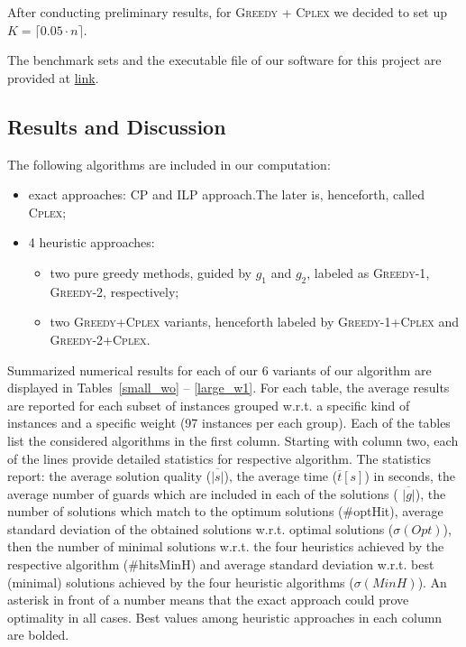\documentclass[runningheads,a4paper]{elsarticle}
\begin{document}
      After conducting preliminary results, for
        \textsc{Greedy + \textsc{Cplex}} we decided to set up $K = \lceil 0.05 \cdot n \rceil$.

     The benchmark sets and the executable file of our software for this project are provided at \href{link}{link}.
	\subsection{Results and Discussion}
        The following algorithms are included in our computation:
        \begin{itemize}
        	\item  exact approaches: CP and ILP approach.The later is, henceforth, called \textsc{Cplex};
            \item 4 heuristic approaches:
           \begin{itemize}
           	\item two pure greedy methods, guided by $g_1$ and $g_2$, labeled as \textsc{Greedy-1}, \textsc{Greedy-2}, respectively;
            \item two \textsc{Greedy+Cplex} variants, henceforth labeled by  \textsc{Greedy-1}+\textsc{Cplex} and
            \textsc{Greedy-2}+\textsc{Cplex}.
        \end{itemize}
    \end{itemize}


         Summarized numerical results for each of our 6 variants of our algorithm are displayed
         in Tables~\ref{small_wo} -- \ref{large_w1}. For each table, the average results are reported for each subset of instances grouped w.r.t. a specific kind of instances and a specific weight (97 instances per each group). Each of the tables list the considered algorithms in the first column. Starting with column two,  each of the lines provide detailed statistics for respective algorithm.  The statistics report: the average solution quality ($\overline{|s|}$), the average time ($\overline{t}[s]$) in seconds, the average number of guards which are included in each of the solutions ( $\overline{|g|}$), the number of solutions which match to the optimum solutions (\#optHit), average standard deviation of the obtained solutions w.r.t. optimal solutions ($\sigma(Opt)$), then the number of minimal solutions w.r.t. the four heuristics achieved by the respective algorithm (\#hitsMinH) and average standard deviation w.r.t. best (minimal) solutions achieved by the four heuristic algorithms   ($\sigma(MinH)$).  An asterisk in front of a number means that the exact approach  could prove optimality in all cases. Best values among heuristic approaches in each column are bolded.
\end{document}
